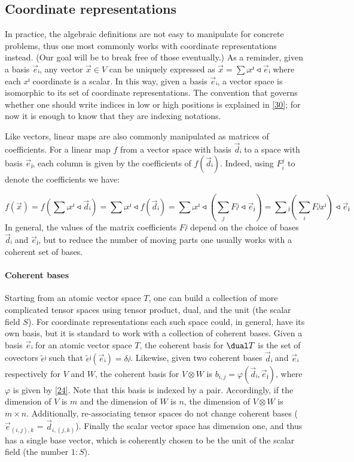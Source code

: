 \documentclass[nolinenum]{jfp}
\begin{document}
\subsection{Coordinate representations}\label{27} 
In practice, the algebraic definitions are not easy to manipulate for
concrete problems, thus one most commonly works with coordinate
representations instead. (Our goal will be to break free of those eventually.)  As a reminder, given a basis \(\vec eᵢ\),
any vector \(\vec x∈V\) can be uniquely expressed as \(\vec x = ∑ᵢ xⁱ
\smalltriangleleft \vec eᵢ\) where each \(xⁱ\) coordinate is a
scalar. In this way, given a basis \(\vec eᵢ\), a vector space is
isomorphic to its set of coordinate representations. The convention
that governs whether one should write indices in low or high positions
is explained in \cref{30}; for now it is enough to know that
they are indexing notations.

Like vectors, linear maps are also commonly manipulated as matrices of coefficients.
For a linear map \(f\) from a vector space with basis \(\vec dᵢ\) to
a space with basis \(\vec eⱼ\), each column is given by the
coefficients of \(f(\vec dᵢ)\). Indeed, using \(F_i^j\) to denote the coefficients we have:

\begin{displaymath}
  f(\vec x) =
  f\left(∑ᵢ xⁱ \smalltriangleleft \vec dᵢ\right) =
  ∑ᵢ xⁱ \smalltriangleleft f(\vec dᵢ) =
  ∑ᵢ xⁱ \smalltriangleleft \left(∑_j Fᵢʲ \smalltriangleleft \vec eⱼ\right) =
  ∑ⱼ \left(∑_i Fᵢʲ xⁱ\right) \smalltriangleleft \vec eⱼ
\end{displaymath} In general, the values of the matrix coefficients \(Fᵢʲ\) depend on
the choice of bases \(\vec dᵢ\) and \(\vec eⱼ\), but to reduce
the number of moving parts one usually works with a coherent set of
bases. 
\paragraph*{Coherent bases}\hspace{1.0ex}\label{28} Starting from an atomic vector space
\(T\), one can build a collection of more complicated tensor spaces
using tensor product, dual, and the unit (the scalar field
\(S\)). For coordinate representations each such space could, in
general, have its own basis, but it is standard to work with a
collection of coherent bases.  Given a basis \(\vec eᵢ\) for an
atomic vector space \(T\), the coherent basis for \(\dual T\) is
the set of covectors \(\tilde eʲ\) such that \(\tilde eʲ(\vec
eᵢ) = δᵢʲ\). Likewise, given two coherent bases \(\vec dᵢ\) and
\(\vec eᵢ\) respectively for \(V\) and \(W\), the coherent
basis for \(V⊗W\) is \(b_{i,j} = φ(\vec dᵢ,\vec eⱼ)\), where
\(φ\) is given by \cref{24}. Note that this basis is indexed
by a pair. Accordingly, if the dimension of \(V\) is \(m\) and
the dimension of \(W\) is \(n\), the dimension of \(V⊗W\) is
\(m×n\). Additionally, re-associating tensor spaces do not change
coherent bases (\(\vec e_{(i,j),k}\) = \(\vec d_{i,(j,k)}\)).
Finally the scalar vector space has dimension one, and thus has a
single base vector, which is coherently chosen to be the unit of the
scalar field (the number \(1 : S\)).   
\end{document}
